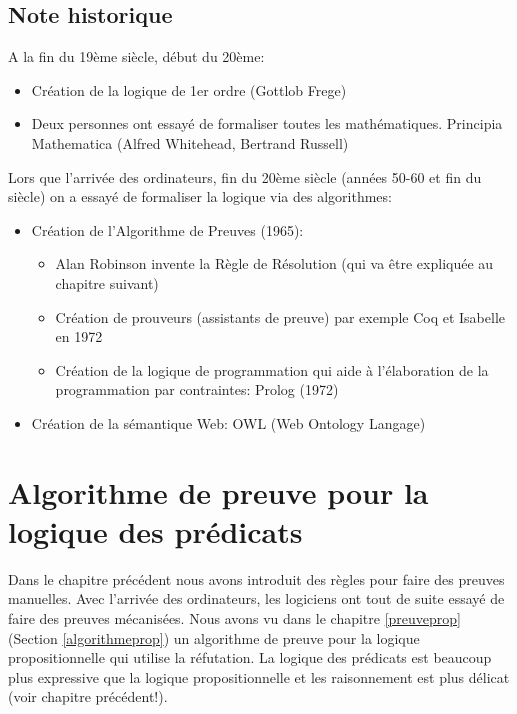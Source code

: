 \section{Note historique}

\hfill {\begin{minipage}{0.90\textwidth}
\begin{small}
A la fin du 19ème siècle, début du 20ème: 
\begin{itemize}
\item Création de la logique de 1er ordre (Gottlob Frege)
\item Deux personnes ont essayé de formaliser toutes les mathématiques. Principia Mathematica (Alfred Whitehead, Bertrand Russell)
\end{itemize}
Lors que l'arrivée des ordinateurs, fin du 20ème siècle (années 50-60 et fin du siècle) on a essayé de formaliser la logique via des algorithmes:
\begin{itemize}
\item Création de l'Algorithme de Preuves (1965):
\begin{itemize}
\item Alan Robinson invente la Règle de Résolution (qui va être expliquée au chapitre suivant)
\item Création de prouveurs (assistants de preuve) par exemple Coq et Isabelle en 1972
\item Création de la logique de programmation qui aide à l'élaboration de la programmation par contraintes: Prolog (1972) 
\end{itemize}
\item Création de la sémantique Web: OWL (Web Ontology Langage)
\end{itemize}
\end{small}
\end{minipage}

\chapter{Algorithme de preuve pour la logique des prédicats}
\label{algorithmepreuve}

Dans le chapitre précédent nous avons introduit des règles pour faire des preuves manuelles.
Avec l'arrivée des ordinateurs, les logiciens ont tout de suite essayé de faire des preuves mécanisées.
Nous avons vu dans le chapitre \ref{preuveprop} (Section \ref{algorithmeprop})
un algorithme de preuve pour la logique propositionnelle qui utilise la réfutation.
La logique des prédicats est beaucoup plus expressive que la logique propositionnelle
et les raisonnement est plus délicat (voir chapitre précédent!).

}

